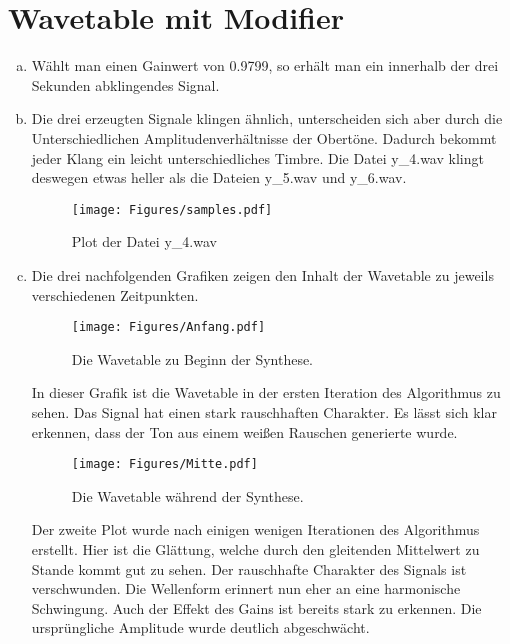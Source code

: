\chapter{Wavetable mit Modifier}


\begin{enumerate}[a)]
\item
Wählt man einen Gainwert von 0.9799, so erhält man ein innerhalb der drei Sekunden abklingendes Signal.
\item
Die drei erzeugten Signale klingen ähnlich, unterscheiden sich aber durch die Unterschiedlichen Amplitudenverhältnisse der Obertöne. Dadurch bekommt jeder Klang ein leicht unterschiedliches Timbre. Die Datei y\_4.wav klingt deswegen etwas heller als die Dateien y\_5.wav und y\_6.wav.
\begin{figure}[H]
    \center
    \texttt{[image: Figures/samples.pdf]}
    \caption{Plot der Datei y\_4.wav}
    \label{fig:bs0}
\end{figure}

\newpage

\item
Die drei nachfolgenden Grafiken zeigen den Inhalt der Wavetable zu jeweils verschiedenen Zeitpunkten.

\begin{figure}[H]
    \center
    \texttt{[image: Figures/Anfang.pdf]}
    \caption{Die Wavetable zu Beginn der Synthese.}
    \label{fig:wavetableBegin}
\end{figure}

In dieser Grafik ist die Wavetable in der ersten Iteration des Algorithmus zu sehen.
Das Signal hat einen stark rauschhaften Charakter.
Es lässt sich klar erkennen, dass der Ton aus einem weißen Rauschen generierte wurde. 

\begin{figure}[H]
    \center
    \texttt{[image: Figures/Mitte.pdf]}
    \caption{Die Wavetable während der Synthese.}
    \label{fig:wavetableMiddle}
\end{figure}

Der zweite Plot wurde nach einigen wenigen Iterationen des Algorithmus erstellt.
Hier ist die Glättung, welche durch den gleitenden Mittelwert zu Stande kommt gut zu sehen.
Der rauschhafte Charakter des Signals ist verschwunden.
Die Wellenform erinnert nun eher an eine harmonische Schwingung.
Auch der Effekt des Gains ist bereits stark zu erkennen.
Die ursprüngliche Amplitude wurde deutlich abgeschwächt.


\end{enumerate}
